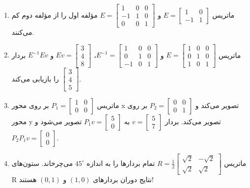 \documentclass[12pt]{article}
\begin{document}
\begin{enumerate}
		\item ماتریس $E= \begin{bmatrix} 1 & 0 \\ -1 & 1 \end{bmatrix}$ و $E= \begin{bmatrix} 1 & 0 & 0 \\ -1 & 1 & 0 \\ 0 & 0 & 1 \end{bmatrix}$ مؤلفه اول را از مؤلفه دوم کم می‌کنند.
		
		\item ماتریس $E= \begin{bmatrix} 1 & 0 & 0 \\ 0 & 1 & 0 \\ 1 & 0 & 1 \end{bmatrix}$ و $E^{-1}= \begin{bmatrix} 1 & 0 & 0 \\ 0 & 1 & 0 \\ -1 & 0 & 1 \end{bmatrix}$، $Ev= \begin{bmatrix} 3 \\ 4 \\ 8 \end{bmatrix}$ و $E^{-1}Ev$ بردار $\begin{bmatrix} 3 \\ 4 \\ 5 \end{bmatrix}$ را بازیابی می‌کند.
		
		\item ماتریس $P_1= \begin{bmatrix} 1 & 0 \\ 0 & 0 \end{bmatrix}$ بر روی محور x تصویر می‌کند و $P_2= \begin{bmatrix} 0 & 0 \\ 0 & 1 \end{bmatrix}$ بر روی محور y تصویر می‌کند. بردار $v= \begin{bmatrix} 5 \\ 7 \end{bmatrix}$ به $P_1v= \begin{bmatrix} 5 \\ 0 \end{bmatrix}$ تصویر می‌شود و $P_2P_1v= \begin{bmatrix} 0 \\ 0 \end{bmatrix}$.
		
		\item ماتریس $R= \frac{1}{2} \begin{bmatrix} \sqrt{2} & -\sqrt{2} \\ \sqrt{2} & \sqrt{2} \end{bmatrix}$ تمام بردارها را به اندازه $45^\circ$ می‌چرخاند. ستون‌های R نتایج دوران بردارهای $(1,0)$ و $(0,1)$ هستند!
		

\end{enumerate}
\end{document}
